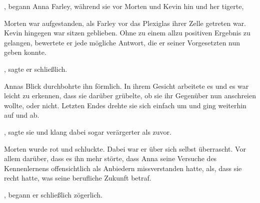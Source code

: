 , begann Anna Farley, während sie vor Morten und Kevin hin und her tigerte, 

\par

Morten war aufgestanden, als Farley vor das Plexiglas ihrer Zelle getreten war. Kevin hingegen war sitzen geblieben. Ohne zu einem allzu positiven Ergebnis zu gelangen, bewertete er jede mögliche Antwort, die er seiner Vorgesetzten nun geben konnte.

\par

, sagte er schließlich.

\par

Annas Blick durchbohrte ihn förmlich. In ihrem Gesicht arbeitete es und es war leicht zu erkennen, dass sie darüber grübelte, ob sie ihr Gegenüber nun anschreien wollte, oder nicht. Letzten Endes drehte sie sich einfach um und ging weiterhin auf und ab.

\par

, sagte sie und klang dabei sogar verärgerter als zuvor. 

\par

Morten wurde rot und schluckte. Dabei war er über sich selbst überrascht. Vor allem darüber, dass es ihn mehr störte, dass Anna seine Versuche des Kennenlernens offensichtlich als Anbiedern missverstanden hatte, als, dass sie recht hatte, was seine berufliche Zukunft betraf.

\par

, begann er schließlich zögerlich. 

\par

